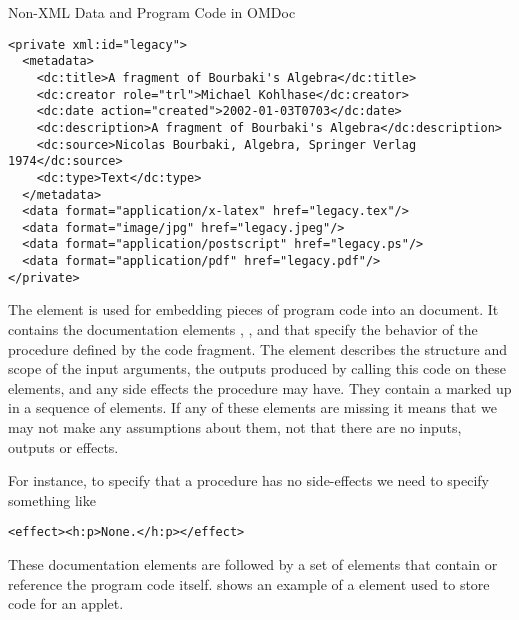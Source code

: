 \begin{module}[id=ext]
\begin{omgroup}[id=ext,short=Auxiliary Elements]
\begin{omgroup}[id=private]{Non-XML Data and Program Code in OMDoc}
\begin{lstlisting}[label=lst:private-fig,index={private,data},
  caption={A {\element{private}} Element for an Image}]
<private xml:id="legacy">
  <metadata>
    <dc:title>A fragment of Bourbaki's Algebra</dc:title>
    <dc:creator role="trl">Michael Kohlhase</dc:creator> 
    <dc:date action="created">2002-01-03T0703</dc:date>
    <dc:description>A fragment of Bourbaki's Algebra</dc:description>
    <dc:source>Nicolas Bourbaki, Algebra, Springer Verlag 1974</dc:source>
    <dc:type>Text</dc:type>
  </metadata>
  <data format="application/x-latex" href="legacy.tex"/>
  <data format="image/jpg" href="legacy.jpeg"/>
  <data format="application/postscript" href="legacy.ps"/>
  <data format="application/pdf" href="legacy.pdf"/>
</private>
\end{lstlisting}

\begin{definition}[id=xputeffect.def]
  The {} element is used for embedding pieces of program code into an
  {\omdoc} document.  It contains the documentation elements {},
  {}, and {} that specify the behavior of the procedure
  defined by the code fragment.  The {} element describes the structure and
  scope of the input arguments, {} the outputs produced by calling this
  code on these elements, and {} any side effects the procedure may have.
  They contain a {} marked up in a sequence of
  {} elements. If any of these elements are missing it means that we may not make any
  assumptions about them, not that there are no inputs, outputs or effects.
\end{definition}
For instance, to specify that a procedure has no side-effects we need to specify something
like
\begin{lstlisting}
<effect><h:p>None.</h:p></effect>
\end{lstlisting}

These documentation elements are followed by a set of {} elements
that contain or reference the program code itself. {} shows an
example of a {} element used to store {} code for an
applet.


\end{omgroup}
\end{omgroup}
\end{module}
